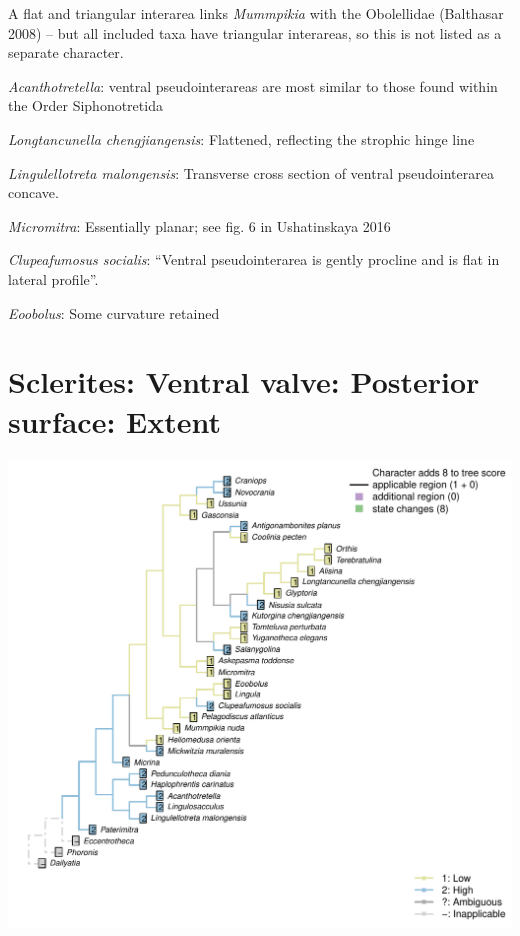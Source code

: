 \documentclass[]{book}
\theoremstyle{definition}
\theoremstyle{definition}
\theoremstyle{definition}
\theoremstyle{remark}
\begin{document}
A flat and triangular interarea links \emph{Mummpikia} with the
Obolellidae (Balthasar 2008) -- but all included taxa have triangular
interareas, so this is not listed as a separate character.

\emph{Acanthotretella}: ventral pseudointerareas are most similar to
those found within the Order Siphonotretida

\emph{Longtancunella chengjiangensis}: Flattened, reflecting the
strophic hinge line

\emph{Lingulellotreta malongensis}: Transverse cross section of ventral
pseudointerarea concave.

\emph{Micromitra}: Essentially planar; see fig. 6 in Ushatinskaya 2016

\emph{Clupeafumosus socialis}: ``Ventral pseudointerarea is gently
procline and is flat in lateral profile''.

\emph{Eoobolus}: Some curvature retained

\hypertarget{sclerites-ventral-valve-posterior-surface-extent}{%
\section*{Sclerites: Ventral valve: Posterior surface:
Extent}\label{sclerites-ventral-valve-posterior-surface-extent}}

\includegraphics{Brachiopod_phylogeny_files/figure-latex/unnamed-chunk-5-34.pdf}
\end{document}
